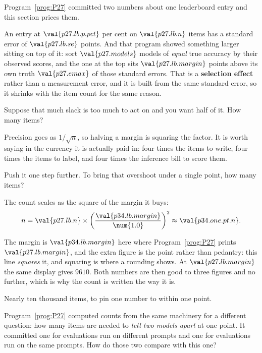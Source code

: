 \begin{fr}
Program~\ref{prog:P27} committed two numbers about one leaderboard entry
and this section prices them.

An entry at $\val{p27.lb.p.pct}$ per cent on $\val{p27.lb.n}$ items has a
standard error of $\val{p27.lb.se}$ points. And that program showed
something larger sitting on top of it: sort $\val{p27.models}$ models of
\emph{equal} true accuracy by their observed scores, and the one at the top
sits $\val{p27.lb.margin}$ points above its own truth \dash{}
$\val{p27.emax}$ of those standard errors. That is a \textbf{selection
effect} rather than a measurement error, and it is built from the same
standard error, so it shrinks with the item count for the same reason.

Suppose that much slack is too much to act on and you want half of it. How
many items?
\dotline
\nextframe
\end{fr}

\begin{fr}

Precision goes as $1/\sqrt{n}$, so halving a margin is squaring the
factor. It is worth saying in the currency it is actually paid in: four
times the items to write, four times the items to label, and four times the
inference bill to score them.

Push it one step further. To bring that overshoot under a single point,
how many items?
\dotline
\nextframe
\end{fr}

\begin{fr}
\begin{ansblock}
The count scales as the square of the margin it buys:
\[ n = \val{p27.lb.n} \times
   \left(\frac{\val{p34.lb.margin}}{\num{1.0}}\right)^{2}
   \approx \val{p34.one.pt.n} . \]
\end{ansblock}

The margin is $\val{p34.lb.margin}$ here where
Program~\ref{prog:P27} prints $\val{p27.lb.margin}$, and the extra figure is
the point rather than pedantry: this line \emph{squares} it, and squaring is
where a rounding shows. At $\val{p27.lb.margin}$ the same display gives
$\num{9610}$. Both numbers are then good to three figures and no further,
which is why the count is written the way it is.

Nearly ten thousand items, to pin one number to within one point.

Program~\ref{prog:P27} computed counts from the same machinery for a
different question: how many items are needed to \emph{tell two models
apart} at one point. It committed one for evaluations run on different
prompts and one for evaluations run on the same prompts. How do those two
compare with this one?
\dotline
\nextframe
\end{fr}

